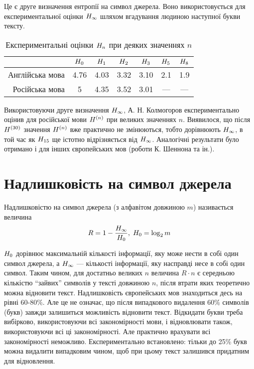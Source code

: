 Це є друге визначення ентропії на символ джерела. Воно використовується для
експериментальної оцінки  $H_\infty$ шляхом вгадування людиною наступної
букви тексту.

\begin{table}[h!]
    \begin{center}
        \begin{tabular}{|r|c|c|c|c|c|c|}
            \hline
            & $H_0$ & $H_1$ & $H_2$ & $H_3$ & $H_5$ & $H_8$ \\
            \hline
            Англійська мова & 4.76 & 4.03 & 3.32 & 3.10 & 2.1 & 1.9 \\
            \hline
            Російська мова & 5 & 4.35 & 3.52 & 3.01 & --- & --- \\
            \hline
        \end{tabular}
      \end{center}
    \caption{Експериментальні оцінки $H_n$ при деяких значеннях $n$}
    \label{table:experimentalEntropy}
\end{table}

Використовуючи друге визначення  $H_\infty$, А. Н. Колмогоров
експериментально оцінив для російської мови  $H^{(n)}$ при великих
значеннях $n$. Виявилося, що після  $H^{\left( 30 \right)}$ значення 
$H^{\left( n \right)}$ вже практично не змінюються, тобто дорівнюють
$H_\infty$, в той час як  $H_{15}$ ще істотно відрізняється від  $H_\infty$.
Аналогічні результати було отримано  і для інших європейських мов (роботи
К. Шеннона та ін.).

\section{Надлишковість на символ джерела}
\begin{definition}
    Надлишковістю на символ джерела (з алфавітом довжиною $m$)
    називається величина
    $$R = 1 - \frac{H_\infty}{H_0},\; H_0=\log_2{m}$$
\end{definition}

$H_0$ дорівнює максимальній кількості інформації, яку може нести в собі
один символ джерела, а  $H_\infty$ --- кількості інформації, яку насправді
несе в собі один символ. Таким чином, для достатньо великих  $n$ величина 
$R\cdot n$ є середньою кількістю “зайвих” символів у тексті довжиною  $n$,
після втрати яких теоретично можна відновити текст. Надлишковість європейських
мов знаходиться десь на рівні 60-80\%. Але це не означає, що після випадкового
видалення 60\% символів (букв) завжди залишиться можливість відновити текст.
Відкидати букви треба вибірково, використовуючи всі закономірності мови, і
відновлювати також, використовуючи всі ці закономірності. Але практично
врахувати всі закономірності неможливо. Експериментально встановлено: тільки до
25\% букв можна видалити випадковим чином, щоб при цьому текст залишився
придатним для відновлення.

